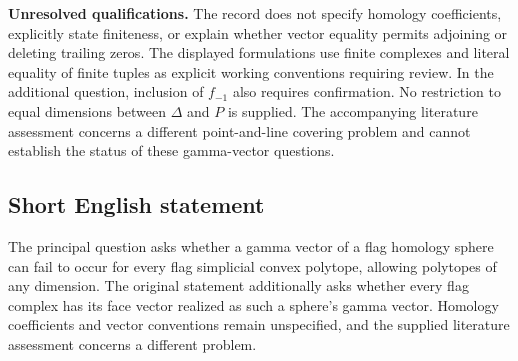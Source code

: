\documentclass[11pt]{article}
\begin{document}
\textbf{Unresolved qualifications.} The record does not specify homology coefficients, explicitly state finiteness, or explain whether vector equality permits adjoining or deleting trailing zeros. The displayed formulations use finite complexes and literal equality of finite tuples as explicit working conventions requiring review. In the additional question, inclusion of \(f_{-1}\) also requires confirmation. No restriction to equal dimensions between \(\Delta\) and \(P\) is supplied. The accompanying literature assessment concerns a different point-and-line covering problem and cannot establish the status of these gamma-vector questions.
\subsection{Short English statement}
The principal question asks whether a gamma vector of a flag homology sphere can fail to occur for every flag simplicial convex polytope, allowing polytopes of any dimension. The original statement additionally asks whether every flag complex has its face vector realized as such a sphere's gamma vector. Homology coefficients and vector conventions remain unspecified, and the supplied literature assessment concerns a different problem.
\end{document}
